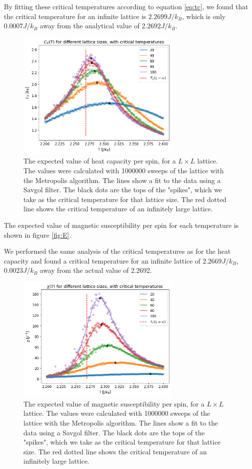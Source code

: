 \documentclass[reprint,english,notitlepage]{revtex4-1}
\begin{document}
	By fitting these critical temperatures according to equation \ref{eq:tc}, we found that the critical temperature for an infinite lattice is $2.2699 J/k_B$, which is only $0.0007 J/k_B$ away from the analytical value of $2.2692 J/k_B$.
	\begin{figure}[H]
		\includegraphics[width=80mm]{../../Code/Figures/Cv.png}
		\caption{The expected value of heat capacity per spin, for a $L \times L$ lattice. The values were calculated with 1000000 sweeps of the lattice with the Metropolis algorithm. The lines show a fit to the data using a Savgol filter. The black dots are the tops of the "spikes", which we take as the critical temperature for that lattice size. The red dotted line shows the critical temperature of an infinitely large lattice.}
		\label{fig:Cv}
	\end{figure}
	The expected value of magnetic susceptibility per spin for each temperature is shown in figure \ref{fig:E}.
	
	We performed the same analysis of the critical temperatures as for the heat capacity and found a critical temperature for an infinite lattice of $2.2669 J/k_B$, $0.0023 J/k_B$ away from the actual value of 2.2692.
	\begin{figure}[H]
		\includegraphics[width=80mm]{../../Code/Figures/X.png}
		\caption{The expected value of magnetic susceptibility per spin, for a $L \times L$ lattice. The values were calculated with 1000000 sweeps of the lattice with the Metropolis algorithm. The lines show a fit to the data using a Savgol filter. The black dots are the tops of the "spikes", which we take as the critical temperature for that lattice size. The red dotted line shows the critical temperature of an infinitely large lattice.}
		\label{fig:X}
	\end{figure}
	
\end{document}
